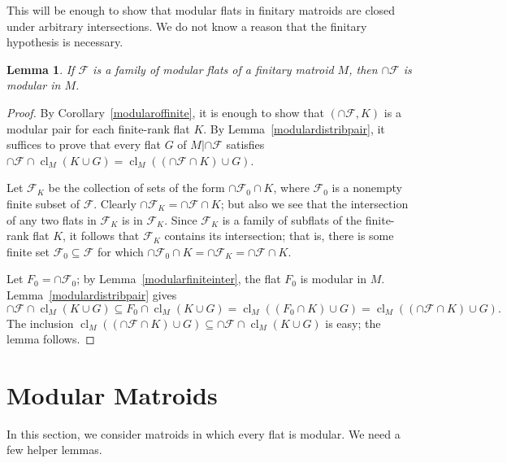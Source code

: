 \documentclass{amsart}
\theoremstyle{plain}
\newtheorem{lemma}[theorem]{Lemma}
\theoremstyle{definition}
\newcommand{\cF}{\mathcal{F}}
\DeclareMathOperator{\cl}{cl}
\renewcommand{\ss}{\subseteq}
\begin{document}
This will be enough to show that modular flats in finitary matroids are closed under arbitrary intersections.
We do not know a reason that the finitary hypothesis is necessary. 

\begin{lemma}\label{modularinter}
  If $\cF$ is a family of modular flats of a finitary matroid $M$, then $\cap \cF$ is modular in $M$. 
\end{lemma}
\begin{proof}
  By Corollary~\ref{modularoffinite}, it is enough to show that $(\cap \cF, K)$ is a modular pair for each 
  finite-rank flat $K$. 
  By Lemma~\ref{modulardistribpair}, it suffices to prove that every flat $G$ of $M | \cap \cF$ 
  satisfies $\cap \cF \cap \cl_M(K \cup G) = \cl_M((\cap \cF \cap K) \cup G)$. 
  
  Let $\cF_K$ be the collection of sets of the form $\cap\cF_0 \cap K$, where $\cF_0$ is a nonempty finite subset of $\cF$. 
  Clearly $\cap \cF_K = \cap \cF \cap K$; but also we see that the intersection of any two flats in $\cF_K$ is in $\cF_K$. 
  Since $\cF_K$ is a family of subflats of the finite-rank flat $K$, it follows that $\cF_K$ contains its intersection; 
  that is, there is some finite set $\cF_0 \ss \cF$ for which $\cap \cF_0 \cap K = \cap \cF_K = \cap \cF \cap K$. 
  
  Let $F_0 = \cap \cF_0$; by Lemma~\ref{modularfiniteinter}, the flat $F_0$ is modular in $M$.
  Lemma~\ref{modulardistribpair} gives
  \[\cap\cF \cap \cl_M(K \cup G) \ss F_0 \cap \cl_M(K \cup G) = \cl_M((F_0 \cap K) \cup G) = \cl_M((\cap \cF \cap K) \cup G).\]
  The inclusion $\cl_M((\cap \cF \cap K) \cup G) \ss \cap\cF \cap \cl_M(K \cup G)$ is easy; the lemma follows. 
\end{proof}

\section{Modular Matroids}

In this section, we consider matroids in which every flat is modular.
We need a few helper lemmas.
\end{document}
